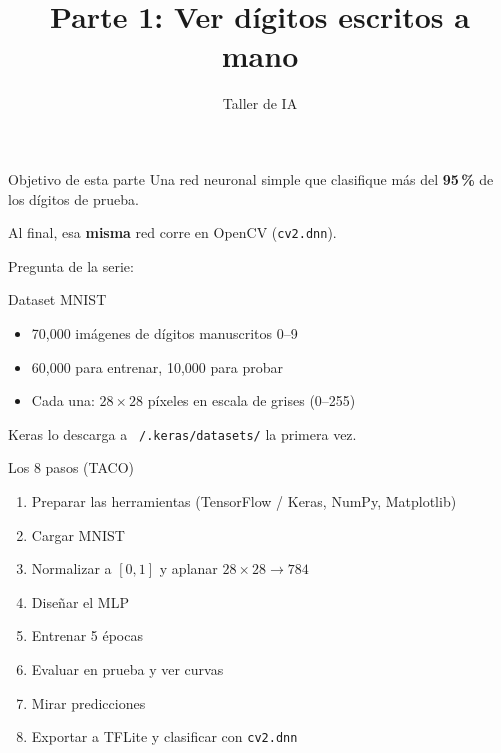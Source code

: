 \documentclass[aspectratio=169]{beamer}
\title{Parte 1: Ver dígitos escritos a mano}
\subtitle{\libreta{01\_taller\_mnist.ipynb}}
\author{Taller de IA}
\begin{document}
\begin{frame}
  \titlepage
\end{frame}

\begin{frame}{Objetivo de esta parte}
  Una red neuronal simple que clasifique más del \textbf{95\,\%} de los dígitos de prueba.

  Al final, esa \textbf{misma} red corre en OpenCV (\texttt{cv2.dnn}).

  \vspace{1em}
  Pregunta de la serie: \pregunta
\end{frame}

\begin{frame}{Dataset MNIST}
  \begin{itemize}
    \item 70{,}000 imágenes de dígitos manuscritos 0--9
    \item 60{,}000 para entrenar, 10{,}000 para probar
    \item Cada una: $28\times 28$ píxeles en escala de grises (0--255)
  \end{itemize}

  Keras lo descarga a \texttt{\string~/.keras/datasets/} la primera vez.
\end{frame}

\begin{frame}{Los 8 pasos (TACO)}
  \begin{enumerate}
    \item Preparar las herramientas (TensorFlow / Keras, NumPy, Matplotlib)
    \item Cargar MNIST
    \item Normalizar a $[0,1]$ y aplanar $28\times28 \to 784$
    \item Diseñar el MLP
    \item Entrenar 5 épocas
    \item Evaluar en prueba y ver curvas
    \item Mirar predicciones
    \item Exportar a TFLite y clasificar con \texttt{cv2.dnn}
  \end{enumerate}
\end{frame}
\end{document}
